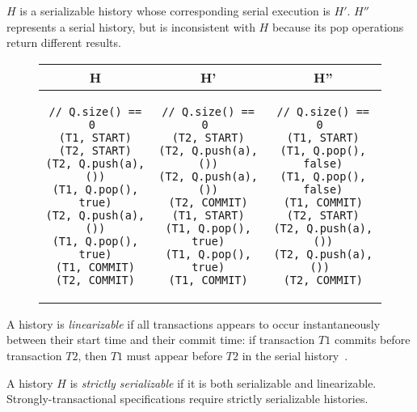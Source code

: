 \begin{eg}
    $H$ is a serializable history whose corresponding serial execution is $H'$. $H''$ represents a serial history, but is inconsistent with $H$ because its pop operations return different results.
\begin{figure}[H]
\singlespacing   
   \begin{tabular}{c|c|c}
H & H' & H''\\
\hline
\begin{lstlisting}
// Q.size() == 0 
(T1, START)
(T2, START)
(T2, Q.push(a), ())
(T1, Q.pop(), true)
(T2, Q.push(a), ())
(T1, Q.pop(), true)
(T1, COMMIT)
(T2, COMMIT)
\end{lstlisting} & 
\begin{lstlisting}
// Q.size() == 0 
(T2, START)
(T2, Q.push(a), ())
(T2, Q.push(a), ())
(T2, COMMIT)
(T1, START)
(T1, Q.pop(), true)
(T1, Q.pop(), true)
(T1, COMMIT)
\end{lstlisting} &
\begin{lstlisting}
// Q.size() == 0 
(T1, START)
(T1, Q.pop(), false)
(T1, Q.pop(), false)
(T1, COMMIT)
(T2, START)
(T2, Q.push(a), ())
(T2, Q.push(a), ()) 
(T2, COMMIT)
\end{lstlisting}
\end{tabular}
\end{figure}
\end{eg}

\begin{defn}
A history is \emph{linearizable} if all transactions appears to occur instantaneously between their start time and their commit time: if transaction $T1$ commits before transaction $T2$, then $T1$ must appear before $T2$ in the serial history~\cite{harristm}.
\end{defn}

\begin{defn}
    A history $H$ is \emph{strictly serializable} if it is both serializable and linearizable. Strongly-transactional specifications require strictly serializable histories.
\end{defn}


